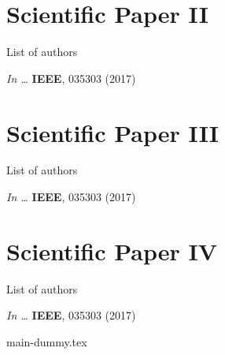 \cleardoublepage



\renewcommand{\boxsizept}{52pt}
\chapter{Scientific Paper II}
\thispagestyle{empty}

\noindent List of authors\vspace{3ex}

\noindent \textit{In \Proc \IntlConf \ldots} \textbf{IEEE}, 035303 (2017)
\cleardoublepage


\renewcommand{\boxsizept}{56pt}
\chapter{Scientific Paper III}
\thispagestyle{empty}

\noindent List of authors\vspace{3ex}

\noindent \textit{In \Proc \IntlConf \ldots} \textbf{IEEE}, 035303 (2017)
\cleardoublepage


\renewcommand{\boxsizept}{60pt}

\chapter{Scientific Paper IV}
\thispagestyle{empty}

\noindent List of authors\vspace{3ex}

\noindent \textit{In \Proc \IntlConf \ldots} \textbf{IEEE}, 035303 (2017)
\cleardoublepage

\pagestyle{compiledpapers} %

{main-dummy.tex}

